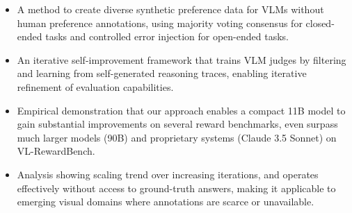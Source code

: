\begin{itemize}[noitemsep,topsep=0pt,leftmargin=*]
    \item A method to create diverse synthetic preference data for VLMs without human preference annotations, using majority voting consensus for closed-ended tasks and controlled error injection for open-ended tasks.
    
    \item An iterative self-improvement framework that trains VLM judges by filtering and learning from self-generated reasoning traces, enabling iterative refinement of evaluation capabilities.
    
    \item Empirical demonstration that our approach enables a compact 11B model to gain substantial improvements on several reward benchmarks, even surpass much larger models (90B) and proprietary systems (Claude 3.5 Sonnet) on VL-RewardBench.
    
    \item Analysis showing scaling trend over increasing iterations, and operates effectively without access to ground-truth answers, making it applicable to emerging visual domains where annotations are scarce or unavailable.
\end{itemize}

